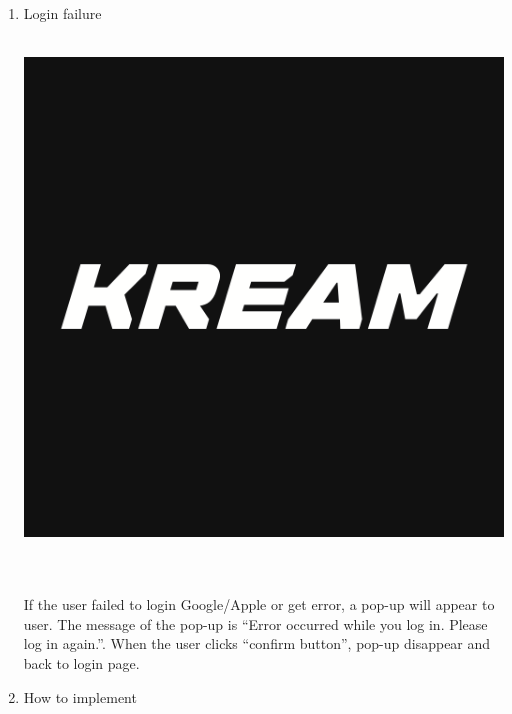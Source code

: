 \documentclass[conference]{IEEEtran}
\begin{document}
\begin{enumerate}
    \item Login failure\\\\
\centerline{\includegraphics[scale=0.2]{pics/KREAM.png}}\\
\\If the user failed to login Google/Apple or get error, a pop-up will appear to user. The message of the pop-up is “Error occurred while you log in. Please log in again.”. When the user clicks “confirm button”, pop-up disappear and back to login page.\\
    \item How to implement\\
\end{enumerate}
\end{document}
